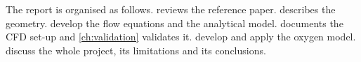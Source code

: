 The report is organised as follows.  reviews the reference paper.  describes the geometry.  develop the flow equations and the analytical model.  documents the CFD set-up and \cref{ch:validation} validates it.  develop and apply the oxygen model.  discuss the whole project, its limitations and its conclusions.
